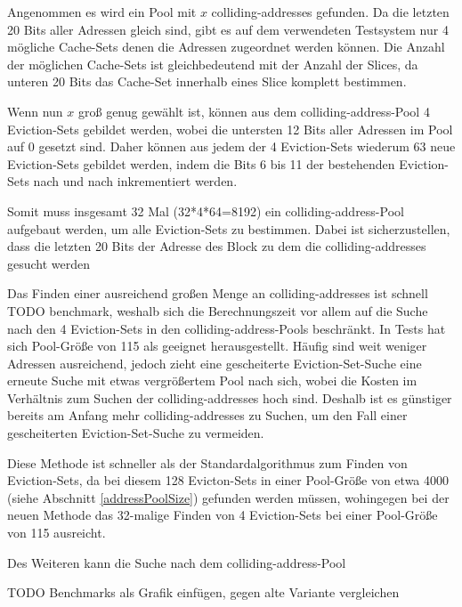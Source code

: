 Angenommen es wird ein Pool mit $x$ colliding-addresses gefunden.
Da die letzten 20 Bits aller Adressen gleich sind, gibt es auf dem verwendeten Testsystem nur 4 mögliche Cache-Sets denen die Adressen zugeordnet werden können.
Die Anzahl der möglichen Cache-Sets ist gleichbedeutend mit der Anzahl der Slices, da unteren 20 Bits das Cache-Set innerhalb eines Slice komplett bestimmen.

Wenn nun $x$ groß genug gewählt ist, können aus dem colliding-address-Pool 4 Eviction-Sets gebildet werden, wobei die untersten 12 Bits aller Adressen im Pool auf 0 gesetzt sind. Daher können aus jedem der 4 Eviction-Sets wiederum 63 neue Eviction-Sets gebildet werden, indem die Bits 6 bis 11 der bestehenden Eviction-Sets nach und nach inkrementiert werden.

Somit muss insgesamt 32 Mal (32*4*64=8192) ein colliding-address-Pool aufgebaut werden, um alle Eviction-Sets zu bestimmen.
Dabei ist sicherzustellen, dass die letzten 20 Bits der Adresse des Block zu dem die colliding-addresses gesucht werden 

Das Finden einer ausreichend großen Menge an colliding-addresses ist schnell TODO benchmark, weshalb sich die Berechnungszeit vor allem auf die Suche nach den 4 Eviction-Sets in den colliding-address-Pools beschränkt.
In Tests hat sich Pool-Größe von 115 als geeignet herausgestellt.
Häufig sind weit weniger Adressen ausreichend, jedoch zieht eine gescheiterte Eviction-Set-Suche eine erneute Suche mit etwas vergrößertem Pool nach sich, wobei die Kosten im Verhältnis zum Suchen der colliding-addresses hoch sind.
Deshalb ist es günstiger bereits am Anfang mehr colliding-addresses zu Suchen, um den Fall einer gescheiterten Eviction-Set-Suche zu vermeiden.

Diese Methode ist schneller als der Standardalgorithmus zum Finden von Eviction-Sets, da bei diesem 128 Evicton-Sets in einer Pool-Größe von etwa 4000 (siehe Abschnitt \ref{addressPoolSize}) gefunden werden müssen, wohingegen bei der neuen Methode das 32-malige Finden von 4 Eviction-Sets bei einer Pool-Größe von 115 ausreicht.

Des Weiteren kann die Suche nach dem colliding-address-Pool

TODO Benchmarks als Grafik einfügen, gegen alte Variante vergleichen








